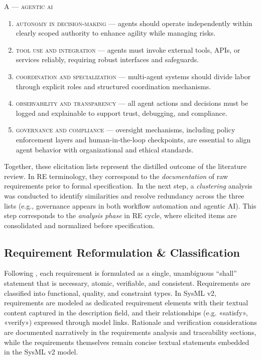 \noindent\textsc{A --- agentic ai}
\begin{enumerate}
  \item \textsc{autonomy in decision-making} --- agents should operate independently within clearly scoped authority to enhance agility while managing risks.
  \item \textsc{tool use and integration} --- agents must invoke external tools, APIs, or services reliably, requiring robust interfaces and safeguards.
  \item \textsc{coordination and specialization} --- multi-agent systems should divide labor through explicit roles and structured coordination mechanisms.
  \item \textsc{observability and transparency} --- all agent actions and decisions must be logged and explainable to support trust, debugging, and compliance.
  \item \textsc{governance and compliance} --- oversight mechanisms, including policy enforcement layers and human-in-the-loop checkpoints, are essential to align agent behavior with organizational and ethical standards.
\end{enumerate}

Together, these elicitation lists represent the distilled outcome of the literature review. In RE terminology, they correspond to the \emph{documentation} of raw requirements prior to formal specification.~In the next step, a \emph{clustering} analysis was conducted to identify similarities and resolve redundancy across the three lists (e.g., governance appears in both workflow automation and agentic AI). This step corresponds to the \emph{analysis phase} in \textcite{herrmannGrundlagen2022} RE cycle, where elicited items are consolidated and normalized before specification.


\subsection{Requirement Reformulation \& Classification}\label{subsec:req-clas}
Following \textcite{glinzHandbook2020}, each requirement is formulated as a single, unambiguous “shall” statement that is necessary, atomic, verifiable, and consistent. Requirements are classified into functional, quality, and constraint types. In SysML v2, requirements are modeled as dedicated requirement elements with their textual content captured in the description field, and their relationships (e.g. «satisfy», «verify») expressed through model links. Rationale and verification considerations are documented narratively in the requirements analysis and traceability sections, while the requirements themselves remain concise textual statements embedded in the SysML v2 model.

